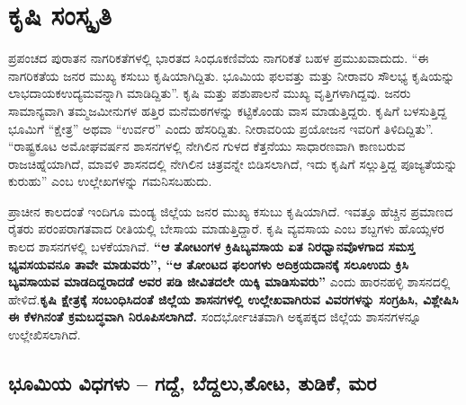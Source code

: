 \chapter{ಕೃಷಿ ಸಂಸ್ಕೃತಿ}

\vskip 4pt

ಪ್ರಪಂಚದ ಪುರಾತನ ನಾಗರಿಕತೆಗಳಲ್ಲಿ ಭಾರತದ ಸಿಂಧೂಕಣಿವೆಯ ನಾಗರಿಕತೆ ಬಹಳ ಪ್ರಮುಖವಾದುದು. “ಈ ನಾಗರಿಕತೆಯ ಜನರ ಮುಖ್ಯ ಕಸುಬು ಕೃಷಿಯಾಗಿದ್ದಿತು. ಭೂಮಿಯ ಫಲವತ್ತು ಮತ್ತು ನೀರಾವರಿ ಸೌಲಭ್ಯ ಕೃಷಿಯನ್ನು ಲಾಭದಾಯಕ\break ಉದ್ಯಮವನ್ನಾಗಿ ಮಾಡಿದ್ದಿತು”. ಕೃಷಿ ಮತ್ತು ಪಶುಪಾಲನೆ ಮುಖ್ಯ ವೃತ್ತಿಗಳಾಗಿದ್ದವು. ಜನರು ಸಾಮಾನ್ಯವಾಗಿ ತಮ್ಮ\break ಜಮೀನುಗಳ ಹತ್ತಿರ ಮನೆಮಠಗಳನ್ನು ಕಟ್ಟಿಕೊಂಡು ವಾಸ ಮಾಡುತ್ತಿದ್ದರು. ಕೃಷಿಗೆ ಬಳಸುತ್ತಿದ್ದ ಭೂಮಿಗೆ “ಕ್ಷೇತ್ರ” ಅಥವಾ “ಉರ್ವರ” ಎಂದು ಹೆಸರಿದ್ದಿತು. ನೀರಾವರಿಯ ಪ್ರಯೋಜನ ಇವರಿಗೆ ತಿಳಿದಿದ್ದಿತು”. “ರಾಷ್ಟ್ರಕೂಟ ಅಮೋಘವರ್ಷನ ಶಾಸನಗಳಲ್ಲಿ ನೇಗಿಲಿನ ಗುಳದ ಕೆತ್ತನೆಯು ಸಾಧಾರಣವಾಗಿ ಕಾಣಬರುವ ರಾಜಚಿಹ್ನೆಯಾಗಿದೆ, ಮಾವಳಿ ಶಾಸನದಲ್ಲಿ ನೇಗಿಲಿನ ಚಿತ್ರವನ್ನೇ ಬಿಡಿಸಲಾಗಿದೆ, ಇದು ಕೃಷಿಗೆ ಸಲ್ಲುತ್ತಿದ್ದ ಪೂಜ್ಯತೆಯನ್ನು ಕುರುಹು” ಎಂಬ ಉಲ್ಲೇಖಗಳನ್ನು ಗಮನಿಸಬಹುದು.

ಪ್ರಾಚೀನ ಕಾಲದಂತೆ ಇಂದಿಗೂ ಮಂಡ್ಯ ಜಿಲ್ಲೆಯ ಜನರ ಮುಖ್ಯ ಕಸುಬು ಕೃಷಿಯಾಗಿದೆ. ಇವತ್ತೂ ಹೆಚ್ಚಿನ ಪ್ರಮಾಣದ ರೈತರು ಪರಂಪರಾಗತವಾದ ರೀತಿಯಲ್ಲಿ ಬೇಸಾಯ ಮಾಡುತ್ತಿದ್ದಾರೆ. ಕೃಷಿ ವ್ಯವಸಾಯ ಎಂಬ ಶಬ್ದಗಳು ಹೊಯ್ಸಳರ ಕಾಲದ ಶಾಸನಗಳಲ್ಲಿ ಬಳಕೆಯಾಗಿವೆ. \textbf{“ಆ ತೋಟಂಗಳ ಕ್ರಿಷಿಬ್ಯವಸಾಯ ಏತ ನಿರಧ್ವಾನವೊಳಗಾದ ಸಮಸ್ತ ಭ್ಯವಸಯವನೂ ತಾವೇ ಮಾಡುವರು”, “ಆ ತೋಂಟದ ಫಲಂಗಳು ಅದಿಕ್ರಯದಾನಕ್ಕೆ ಸಲೂಉದು ಕ್ರಿಸಿ ಬ್ಯವಸಾಯವ ಮಾಡದಿದ್ದರಾದಡೆ ಅವರ ಪಡಿ ಜೀವಿತದಲೇ ಯಿಕ್ಕಿ ಮಾಡಿಸುವರು”} ಎಂದು ಹಾರನಹಳ್ಳಿ ಶಾಸನದಲ್ಲಿ ಹೇಳಿದೆ.\textbf{ಕೃಷಿ ಕ್ಷೇತ್ರಕ್ಕೆ ಸಂಬಂಧಿಸಿದಂತೆ ಜಿಲ್ಲೆಯ ಶಾಸನಗಳಲ್ಲಿ ಉಲ್ಲೇಖವಾಗಿರುವ ವಿವರಗಳನ್ನು ಸಂಗ್ರಹಿಸಿ, ವಿಶ್ಲೇಷಿಸಿ ಈ ಕೆಳಗಿನಂತೆ ಕ್ರಮಬದ್ಧವಾಗಿ ನಿರೂಪಿಸಲಾಗಿದೆ.} ಸಂದರ್ಭೋಚಿತವಾಗಿ ಅಕ್ಕಪಕ್ಕದ ಜಿಲ್ಲೆಯ ಶಾಸನಗಳನ್ನೂ ಉಲ್ಲೇಖಿಸಲಾಗಿದೆ.

\section{ಭೂಮಿಯ ವಿಧಗಳು – ಗದ್ದೆ, ಬೆದ್ದಲು,ತೋಟ, ತುಡಿಕೆ, ಮರ}
    

